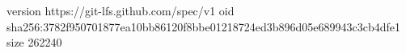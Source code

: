 version https://git-lfs.github.com/spec/v1
oid sha256:3782f950701877ea10bb86120f8bbe01218724ed3b896d05e689943c3cb4dfe1
size 262240
